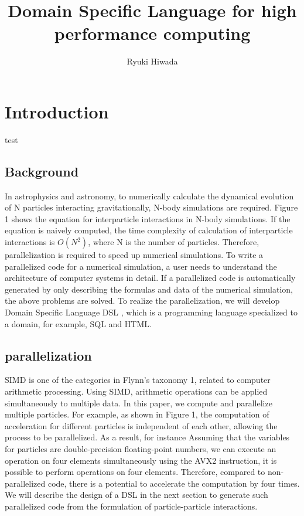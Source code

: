 \documentclass[ams, a4j]{U-AizuGT}
\author{Ryuki Hiwada}
\title{Domain Specific Language for high performance computing}
\begin{document}
\maketitle
\begin{abstract}

\end{abstract}
\section{Introduction}

test

\subsection{Background}
In astrophysics and astronomy, to numerically calculate the dynamical 
evolution of N particles interacting gravitationally, N-body simulations 
are required. Figure 1 shows the equation for interparticle interactions 
in N-body simulations. If the equation is naively computed, the time
complexity of calculation of interparticle interactions is 
\begin{math}O(N^2) \end{math}, where 
N is the number of particles. Therefore, parallelization is required to
speed up numerical simulations. To write a parallelized code for a 
numerical simulation, a user needs to understand the architecture of 
computer systems in  detail. If a parallelized code is automatically
generated by only describing the formulas and data of the numerical
simulation, the above problems are solved. To realize the parallelization,
we will develop Domain Specific Language  DSL \rparen, which is a 
programming language specialized to a domain, for example, SQL and HTML.
\subsection{parallelization}
SIMD is one of the categories in Flynn's taxonomy 1, related to computer arithmetic
 processing. Using SIMD, arithmetic operations can be applied simultaneously to
multiple data. In this paper, we compute and parallelize multiple particles. For example, 
as shown in Figure 1, the computation of acceleration for different particles is independent
of each other, allowing the process to be parallelized. As a result, for instance Assuming 
that the variables for particles are double-precision floating-point numbers, we can execute 
an operation on four elements simultaneously using the AVX2 instruction, it is possible to 
perform operations on four elements. Therefore, compared to non-parallelized code, there is
a potential to accelerate the computation by four times. We will describe the design of a 
DSL in the next section to generate such parallelized code from the formulation of particle-particle interactions.
\end{document}
